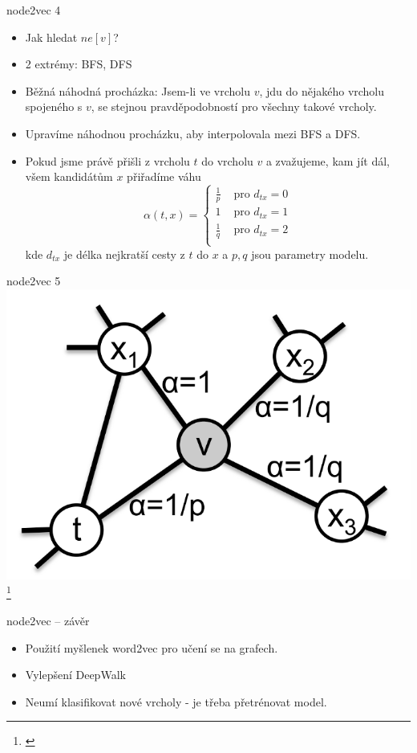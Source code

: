 \documentclass[10pt]{beamer}
\begin{document}
\begin{frame}{node2vec 4}
	\begin{itemize}
		\item Jak hledat \( ne \left[ v \right] \)?
		\item 2 extrémy: BFS, DFS
		\item Běžná náhodná procházka: Jsem-li ve vrcholu \( v \), jdu do nějakého vrcholu spojeného s \( v \), se stejnou pravděpodobností pro všechny takové vrcholy.
		\item Upravíme náhodnou procházku, aby interpolovala mezi BFS a DFS.
		\item Pokud jsme právě přišli z vrcholu \( t \) do vrcholu \( v \) a zvažujeme, kam jít dál, všem kandidátům \( x \) přiřadíme váhu
			\[ \alpha \left( t, x \right) = \begin{cases}
				\frac{1}{p} &\text{ pro } d_{tx} = 0 \\
				1 &\text{ pro } d_{tx} = 1 \\
				\frac{1}{q} &\text{ pro } d_{tx} = 2 \\
			\end{cases} \]
			kde \( d_{tx} \) je délka nejkratší cesty z \( t \) do \( x \) a \( p, q \) jsou parametry modelu.
	\end{itemize}
\end{frame}

\begin{frame}{node2vec 5}
	\centering
	\includegraphics[width=0.7\pagewidth]{images/node2vec-alpha.png}\footnote{\cite{grover_node2vec_2016}}
\end{frame}

\begin{frame}{node2vec -- závěr}
	\begin{itemize}
		\item Použití myšlenek word2vec pro učení se na grafech.
		\item Vylepšení DeepWalk
		\item Neumí klasifikovat nové vrcholy - je třeba přetrénovat model.
	\end{itemize}
\end{frame}
\end{document}
